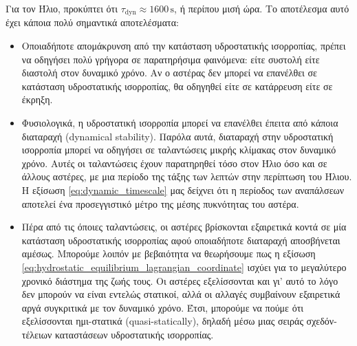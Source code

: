 Για τον Ήλιο, προκύπτει ότι $\tau_{\text{dyn}} \approx 1600 \,\text{s}$, ή περίπου μισή ώρα. Το αποτέλεσμα αυτό έχει κάποια πολύ σημαντικά αποτελέσματα:
\begin{itemize}
    \item Οποιαδήποτε απομάκρυνση από την κατάσταση υδροστατικής ισορροπίας, πρέπει να οδηγήσει πολύ γρήγορα σε παρατηρήσιμα φαινόμενα: είτε συστολή είτε διαστολή στον δυναμικό χρόνο. Αν ο αστέρας δεν μπορεί να επανέλθει σε κατάσταση υδροστατικής ισορροπίας, θα οδηγηθεί είτε σε κατάρρευση είτε σε έκρηξη.
    \item Φυσιολογικά, η υδροστατική ισορροπία μπορεί να επανέλθει έπειτα από κάποια διαταραχή (dynamical stability). Παρόλα αυτά, διαταραχή στην υδροστατική ισορροπία μπορεί να οδηγήσει σε ταλαντώσεις μικρής κλίμακας στον δυναμικό χρόνο. Αυτές οι ταλαντώσεις έχουν παρατηρηθεί τόσο στον Ήλιο όσο και σε άλλους αστέρες, με μια περίοδο της τάξης των λεπτών στην περίπτωση του Ήλιου. Η εξίσωση \eqref{eq:dynamic_timescale} μας δείχνει ότι η περίοδος των αναπάλσεων αποτελεί ένα προσεγγιστικό μέτρο της μέσης πυκνότητας του αστέρα.
    \item Πέρα από τις όποιες ταλαντώσεις, οι αστέρες βρίσκονται εξαιρετικά κοντά σε μία κατάσταση υδροστατικής ισορροπίας αφού οποιαδήποτε διαταραχή αποσβήνεται αμέσως. Μπορούμε λοιπόν με βεβαιότητα να θεωρήσουμε πως η εξίσωση \eqref{eq:hydrostatic_equilibrium_lagrangian_coordinate} ισχύει για το μεγαλύτερο χρονικό διάστημα της ζωής τους. Οι αστέρες εξελίσσονται και γι' αυτό το λόγο δεν μπορούν να είναι εντελώς στατικοί, αλλά οι αλλαγές συμβαίνουν εξαιρετικά αργά συγκριτικά με τον δυναμικό χρόνο. Έτσι, μπορούμε να πούμε ότι εξελίσσονται ημι-στατικά (quasi-statically), δηλαδή μέσω μιας σειράς σχεδόν-τέλειων καταστάσεων υδροστατικής ισορροπίας.
\end{itemize}
